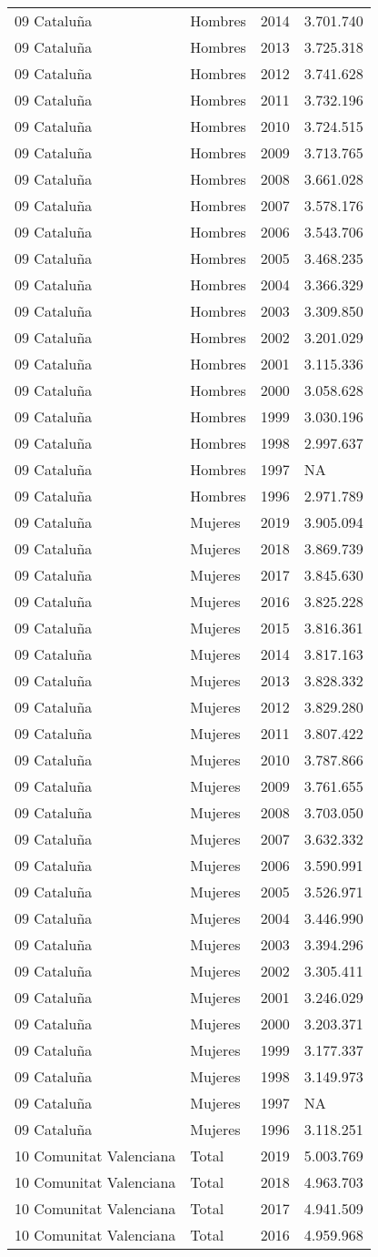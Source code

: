 \documentclass[
]{article}
\begin{document}
\begin{longtable}[]{@{}llrl@{}}
09 Cataluña & Hombres & 2014 & 3.701.740\tabularnewline
09 Cataluña & Hombres & 2013 & 3.725.318\tabularnewline
09 Cataluña & Hombres & 2012 & 3.741.628\tabularnewline
09 Cataluña & Hombres & 2011 & 3.732.196\tabularnewline
09 Cataluña & Hombres & 2010 & 3.724.515\tabularnewline
09 Cataluña & Hombres & 2009 & 3.713.765\tabularnewline
09 Cataluña & Hombres & 2008 & 3.661.028\tabularnewline
09 Cataluña & Hombres & 2007 & 3.578.176\tabularnewline
09 Cataluña & Hombres & 2006 & 3.543.706\tabularnewline
09 Cataluña & Hombres & 2005 & 3.468.235\tabularnewline
09 Cataluña & Hombres & 2004 & 3.366.329\tabularnewline
09 Cataluña & Hombres & 2003 & 3.309.850\tabularnewline
09 Cataluña & Hombres & 2002 & 3.201.029\tabularnewline
09 Cataluña & Hombres & 2001 & 3.115.336\tabularnewline
09 Cataluña & Hombres & 2000 & 3.058.628\tabularnewline
09 Cataluña & Hombres & 1999 & 3.030.196\tabularnewline
09 Cataluña & Hombres & 1998 & 2.997.637\tabularnewline
09 Cataluña & Hombres & 1997 & NA\tabularnewline
09 Cataluña & Hombres & 1996 & 2.971.789\tabularnewline
09 Cataluña & Mujeres & 2019 & 3.905.094\tabularnewline
09 Cataluña & Mujeres & 2018 & 3.869.739\tabularnewline
09 Cataluña & Mujeres & 2017 & 3.845.630\tabularnewline
09 Cataluña & Mujeres & 2016 & 3.825.228\tabularnewline
09 Cataluña & Mujeres & 2015 & 3.816.361\tabularnewline
09 Cataluña & Mujeres & 2014 & 3.817.163\tabularnewline
09 Cataluña & Mujeres & 2013 & 3.828.332\tabularnewline
09 Cataluña & Mujeres & 2012 & 3.829.280\tabularnewline
09 Cataluña & Mujeres & 2011 & 3.807.422\tabularnewline
09 Cataluña & Mujeres & 2010 & 3.787.866\tabularnewline
09 Cataluña & Mujeres & 2009 & 3.761.655\tabularnewline
09 Cataluña & Mujeres & 2008 & 3.703.050\tabularnewline
09 Cataluña & Mujeres & 2007 & 3.632.332\tabularnewline
09 Cataluña & Mujeres & 2006 & 3.590.991\tabularnewline
09 Cataluña & Mujeres & 2005 & 3.526.971\tabularnewline
09 Cataluña & Mujeres & 2004 & 3.446.990\tabularnewline
09 Cataluña & Mujeres & 2003 & 3.394.296\tabularnewline
09 Cataluña & Mujeres & 2002 & 3.305.411\tabularnewline
09 Cataluña & Mujeres & 2001 & 3.246.029\tabularnewline
09 Cataluña & Mujeres & 2000 & 3.203.371\tabularnewline
09 Cataluña & Mujeres & 1999 & 3.177.337\tabularnewline
09 Cataluña & Mujeres & 1998 & 3.149.973\tabularnewline
09 Cataluña & Mujeres & 1997 & NA\tabularnewline
09 Cataluña & Mujeres & 1996 & 3.118.251\tabularnewline
10 Comunitat Valenciana & Total & 2019 & 5.003.769\tabularnewline
10 Comunitat Valenciana & Total & 2018 & 4.963.703\tabularnewline
10 Comunitat Valenciana & Total & 2017 & 4.941.509\tabularnewline
10 Comunitat Valenciana & Total & 2016 & 4.959.968\tabularnewline

\end{longtable}
\end{document}
